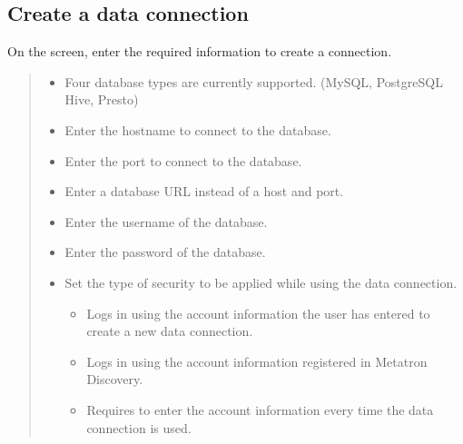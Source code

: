 \documentclass[letterpaper,10pt,english]{sphinxmanual}
\begin{document}
\subsection{Create a data connection}
\label{\detokenize{discovery/part02/data_connection:create-data-connection}}\label{\detokenize{discovery/part02/data_connection:id3}}
On the  screen, enter the required information to create a connection.
\begin{quote}

\begin{figure}[H]
\centering

\noindent{}
\end{figure}
\begin{itemize}
\item {} 
 Four database types are currently supported. (MySQL, PostgreSQL Hive, Presto)

\item {} 
 Enter the hostname to connect to the database.

\item {} 
 Enter the port to connect to the database.

\item {} 
 Enter a database URL instead of a host and port.

\item {} 
 Enter the username of the database.

\item {} 
 Enter the password of the database.

\item {} 
 Set the type of security to be applied while using the data connection.
\begin{itemize}
\item {} 
 Logs in using the account information the user has entered to create a new data connection.

\item {} 
 Logs in using the account information registered in Metatron Discovery.

\item {} 
 Requires to enter the account information every time the data connection is used.


\end{itemize}
\end{itemize}
\end{quote}
\end{document}
